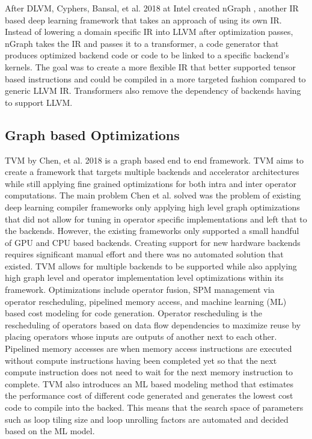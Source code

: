 After DLVM, Cyphers, Bansal, et al. 2018 at Intel created nGraph \cite{nGraph},
another IR based deep learning framework that takes an approach of using its
own IR. Instead of lowering a domain specific IR into LLVM after optimization
passes, nGraph takes the IR and passes it to a transformer, a code generator
that produces optimized backend code or code to be linked to a specific
backend's kernels. The goal was to create a more flexible IR that better supported
tensor based instructions and could be compiled in a more targeted fashion compared
to generic LLVM IR. Transformers also remove the dependency of backends having
to support LLVM.

\subsection{Graph based Optimizations}
TVM by Chen, et al. 2018 is a graph based end to end framework. 
TVM aims to create a framework that targets
multiple backends and accelerator architectures while still applying
fine grained optimizations for both intra and inter operator computations.
The main problem Chen et al. solved was the problem of existing deep learning
compiler frameworks only applying high level graph optimizations that did
not allow for tuning in operator specific implementations and left that to
the backends. However, the existing frameworks only supported a small handful
of GPU and CPU based backends. Creating support for new hardware backends
requires significant manual effort and there was no automated solution that 
existed. TVM allows for multiple backends to be supported while also
applying high graph level and operator implementation level optimizations
within its framework. Optimizations include operator fusion, SPM management via
operator rescheduling, pipelined memory access, and machine learning (ML) based
cost modeling for code generation. 
Operator rescheduling is the rescheduling of operators based
on data flow dependencies to maximize reuse by placing operators whose
inputs are outputs of another next to each other. Pipelined memory accesses are
when memory access instructions are executed without compute instructions having
been completed yet so that the next compute instruction does not need to wait
for the next memory instruction to complete. TVM also introduces an ML
based modeling method that estimates the performance cost of different
code generated and generates the lowest cost code to compile into the backed.
This means that the search space of parameters such as loop tiling size and 
loop unrolling factors are automated and decided based on the ML model.



